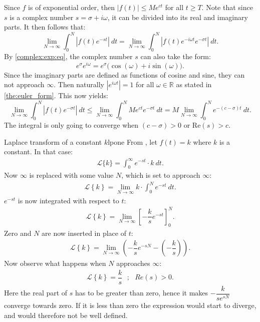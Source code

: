 \begin{prof}{}{}
Since $f$ is of exponential order, then $|f(t)| \leq Me^{ct}$ for all $t \geq T$. Note that since $s$ is a complex number  $s=\sigma+i\omega$, it can be divided into its real and imaginary parts. It then follows that: $$\lim_{N \to \infty} \int_{0}^{N} \left|f(t)e^{-st} \right|\ dt = \lim_{N \to \infty} \int_{0}^{N} \left|f(t) e^{-i\omega t} e^{-\sigma t} \right| \ dt.$$
By \cref{complex:exp:eq}, the complex number $s$ can also take the form: 
$$e^{\sigma}e^{i\omega}= e^{\sigma} \big(\cos(\omega)+i\sin(\omega) \big).$$
Since the imaginary parts are defined as functions of cosine and sine, they can not approach $\infty$. Then naturally $\left|e^{i\omega t} \right|=1$ for all $\omega \in \mathbb{R}$ as stated in \cref{the:euler_form}. This now yields: $$\lim_{N \to \infty} \int_{0}^{N} |f(t)e^{-\sigma t}|\ dt \leq \lim_{N \to \infty} \int_{0}^{N} Me^{ct}e^{-\sigma t}\ dt = M \lim_{N \to \infty} \int_{0}^{N}e^{-(c-\sigma)t}\ dt. $$ The integral is only going to converge when $(c-\sigma)>0$ or Re$(s)>c$.
\end{prof}

\begin{example}{Laplace transform of a constant $k$}{lpone}
From , let $f(t)=k$ where $k$ is a constant. In that case:
\begin{align*}
\mathcal{L}\{k\}=\int_{0}^{\infty} e^{-st} \cdot k\ dt.
\end{align*}
Now $\infty$ is replaced with some value $N$, which is set to approach $\infty$:
\begin{align*}
\mathcal{L} \left\{k \right\}= \lim_{N \to \infty} k\cdot \int_{0}^{N} e^{-st}\ dt.
\end{align*}
$e^{-st}$ is now integrated with respect to $t$:
\begin{align*}
\mathcal{L} \left\{k \right\}= \lim_{N \to \infty} \left[ -\dfrac{k}{s} e^{-st} \right]_{0}^{N}.  
\end{align*}
Zero and $N$ are now inserted in place of $t$:
\begin{align*}
\mathcal{L} \left\{k \right\}= \lim_{N \to \infty} \left( -\dfrac{k}{s} e^{-sN} - \left(-\dfrac{k}{s}\right) \right).
\end{align*}
Now observe what happens when $N$ approaches $\infty$:
\begin{align*}
\mathcal{L} \left\{k \right\}=\dfrac{k}{s} \ \ \ ; \ \ \ Re(s) > 0.
\end{align*}
Here the real part of $s$ has to be greater than zero, hence it makes $-\dfrac{k}{se^{sN}}$ converge towards zero. If it is less than zero the expression would start to diverge, and would therefore not be well defined.
\end{example}

